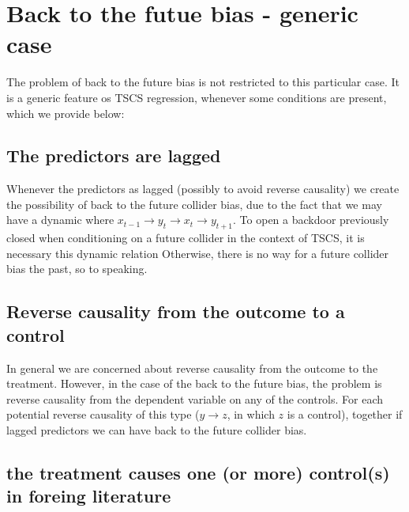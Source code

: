 \documentclass[
  super,
  preprint,
  3p]{elsarticle}
\begin{document}
\hypertarget{back-to-the-futue-bias---generic-case}{%
\section{Back to the futue bias - generic
case}\label{back-to-the-futue-bias---generic-case}}

The problem of back to the future bias is not restricted to this
particular case. It is a generic feature os TSCS regression, whenever
some conditions are present, which we provide below:

\hypertarget{the-predictors-are-lagged}{%
\subsection{The predictors are lagged}\label{the-predictors-are-lagged}}

Whenever the predictors as lagged (possibly to avoid reverse causality)
we create the possibility of back to the future collider bias, due to
the fact that we may have a dynamic where
\(x_{t-1} \rightarrow y_t \rightarrow x_t \rightarrow y_{t+1}\). To open
a backdoor previously closed when conditioning on a future collider in
the context of TSCS, it is necessary this dynamic relation Otherwise,
there is no way for a future collider bias the past, so to speaking.

\hypertarget{reverse-causality-from-the-outcome-to-a-control}{%
\subsection{Reverse causality from the outcome to a
control}\label{reverse-causality-from-the-outcome-to-a-control}}

In general we are concerned about reverse causality from the outcome to
the treatment. However, in the case of the back to the future bias, the
problem is reverse causality from the dependent variable on any of the
controls. For each potential reverse causality of this type
(\(y \rightarrow z\), in which \(z\) is a control), together if lagged
predictors we can have back to the future collider bias.

\hypertarget{the-treatment-causes-one-or-more-controls-in-foreing-literature}{%
\subsection{the treatment causes one (or more) control(s) in foreing
literature}\label{the-treatment-causes-one-or-more-controls-in-foreing-literature}}
\end{document}
